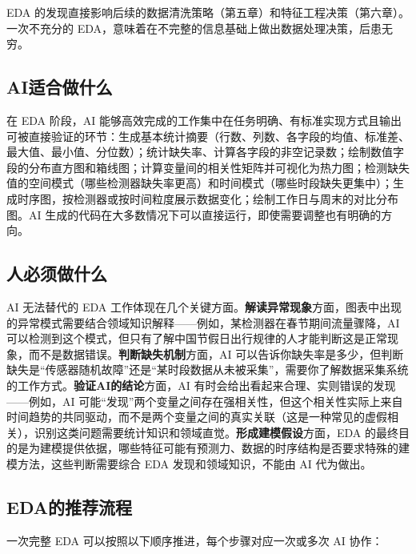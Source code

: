 EDA 的发现直接影响后续的数据清洗策略（第五章）和特征工程决策（第六章）。一次不充分的 EDA，意味着在不完整的信息基础上做出数据处理决策，后患无穷。

\subsection{AI适合做什么}

在 EDA 阶段，AI 能够高效完成的工作集中在任务明确、有标准实现方式且输出可被直接验证的环节：生成基本统计摘要（行数、列数、各字段的均值、标准差、最大值、最小值、分位数）；统计缺失率、计算各字段的非空记录数；绘制数值字段的分布直方图和箱线图；计算变量间的相关性矩阵并可视化为热力图；检测缺失值的空间模式（哪些检测器缺失率更高）和时间模式（哪些时段缺失更集中）；生成时序图，按检测器或按时间粒度展示数据变化；绘制工作日与周末的对比分布图。AI 生成的代码在大多数情况下可以直接运行，即使需要调整也有明确的方向。

\subsection{人必须做什么}

AI 无法替代的 EDA 工作体现在几个关键方面。\textbf{解读异常现象}方面，图表中出现的异常模式需要结合领域知识解释——例如，某检测器在春节期间流量骤降，AI 可以检测到这个模式，但只有了解中国节假日出行规律的人才能判断这是正常现象，而不是数据错误。\textbf{判断缺失机制}方面，AI 可以告诉你缺失率是多少，但判断缺失是“传感器随机故障”还是“某时段数据从未被采集”，需要你了解数据采集系统的工作方式。\textbf{验证AI的结论}方面，AI 有时会给出看起来合理、实则错误的发现——例如，AI 可能“发现”两个变量之间存在强相关性，但这个相关性实际上来自时间趋势的共同驱动，而不是两个变量之间的真实关联（这是一种常见的虚假相关），识别这类问题需要统计知识和领域直觉。\textbf{形成建模假设}方面，EDA 的最终目的是为建模提供依据，哪些特征可能有预测力、数据的时序结构是否要求特殊的建模方法，这些判断需要综合 EDA 发现和领域知识，不能由 AI 代为做出。

\subsection{EDA的推荐流程}

一次完整 EDA 可以按照以下顺序推进，每个步骤对应一次或多次 AI 协作：

